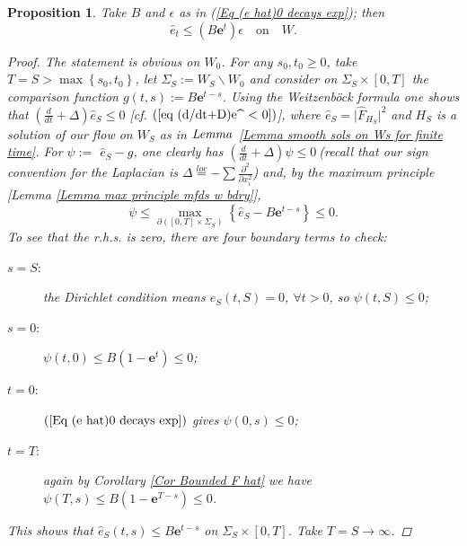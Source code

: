 \documentclass{article}
\newcommand{\e}[1]{\mathbf{e}^{#1}}
\newtheorem{proposition}[theorem]{Proposition}
\begin{document}
\begin{proposition}     \label{Prop e hat decays exponentially along S}
Take $B$ and $\epsilon$ as in (\ref{Eq (e hat)0 decays exp}); then
\begin{equation*}
        \hat{e}_t \leq \left(B\e{t}\right)\epsilon 
        \quad \text{on}\quad W.
\end{equation*}
\begin{proof}
The statement is obvious on $W_{0}$. For any $s_0,t_0\geq 0$, take $T=S>\max
\left\{ s_0,t_0\right\} $, let $\Sigma _{S}:= W_{S}\smallsetminus W_{0}$ and
consider on $\Sigma _{S}\times \left[ 0,T\right] $ the comparison function $%
g\left( t,s\right) := B\e{t-s}$. Using the Weitzenb\"ock formula one shows that  $\left( \frac{d}{dt}+\Delta \right) 
\hat{e}_{S}\leq 0$ [cf. $(\ref{eq (d/dt+D)e^ < 0})$], where $\hat{e}_{S}=\vert \hat{F}_{H_S} \vert^2$ and $H_S$ is a solution of our flow on $W_S$ as in $\emph{Lemma}$\emph{\ \ref{Lemma smooth sols on Ws for finite time}}. For $\psi := $ $\hat{e}%
_{S}-g$, one clearly has $\left( \frac{d}{dt}+\Delta \right) \psi \leq 0\ $(recall that our sign convention for the Laplacian is $\Delta
\overset{loc}{=}\mathbf{-}\sum\frac{\partial ^{2}}{\partial x_{i}^{2}}$) and, by the maximum principle [\emph{Lemma \ref{Lemma max principle mfds w bdry}}],%
\begin{equation*}
\psi \leq \max\limits_{\partial \left( \left[ 0,T\right] \times \Sigma
_{S}\right) }\left\{ \hat{e}_{S}-B\e{t-s}\right\} \leq 0.
\end{equation*}%
To see that the r.h.s. is zero, there are four boundary terms to check:
\begin{description}
        \item[\quad$s=S:$]
the Dirichlet condition means $\hat{e}_{S}\left(
t,S\right) =0$, $\forall t>0$, so $\psi \left( t,S\right) \leq 0$;

        \item[\quad$s=0:$]
$\psi \left( t,0\right) \leq B\left( 1-\e{t}\right)\leq 0$;

        \item[\quad$t=0:$]
$\left( \ref{Eq (e hat)0 decays exp}\right) $ gives $\psi
\left( 0,s\right) \leq 0$;

        \item[\quad$t=T:$]
again by \emph{Corollary \ref{Cor Bounded F hat} }we have 
$\psi \left( T,s\right) \leq B\left( 1-\e{T-s}\right) \leq 0$.
\end{description}
This shows that $\hat{e}_{S}\left( t,s\right) \leq B\e{t-s}$ on $\Sigma_S\times[0,T]$. Take $T=S\rightarrow \infty $.
\end{proof}
\end{proposition}
\end{document}

